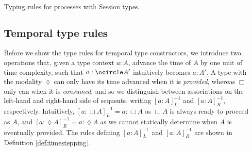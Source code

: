 \begin{table*}[!ht]
\begin{framed}
\begin{align*}
    \end{align*}\vspace{-1em}\end{framed}
    \smallskip
    \caption{Typing rules for processes with Session types.}
    \label{tab:sessiontyperules}
\end{table*}

\subsection{Temporal type rules}
Before we show the type rules for temporal type constructors, we introduce two operations that, given a type context $a:A$, advance the time of $A$ by one unit of time complexity, such that $a: \ocircle A'$ intuitively becomes $a:A'$. A type with the modality $\lozenge$ can only have its time advanced when it is \textit{provided}, whereas $\Box$ only can when it is \textit{consumed}, and so we distinguish between associations on the left-hand and right-hand side of sequents, writing $[a:A]^{-1}_L$ and $[a:A]^{-1}_R$, respectively. Intuitively, $[a:\Box A]^{-1}_L = a:\Box A$ as $\Box A$ is always ready to proceed as $A$, and $[a:\lozenge A]^{-1}_R = a : \lozenge A$ as we cannot statically determine when $A$ is eventually provided. The rules defining $[a:A]^{-1}_L$ and $[a:A]^{-1}_R$ are shown in Definition \ref{def:timestepping}.

